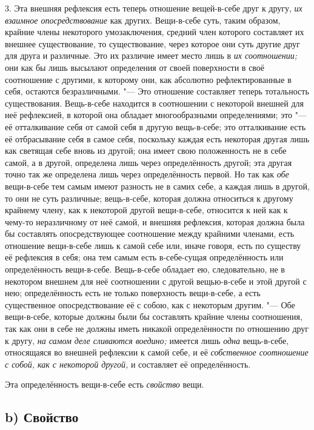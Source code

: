 3. Эта внешняя рефлексия есть теперь отношение вещей-в-себе друг к другу,
{\em их взаимное опосредствование} как других.
Вещи-в-себе суть, таким образом, крайние члены некоторого умозаключения,
средний член которого составляет их внешнее существование, то
существование, через которое они суть другие друг для друга и различные.
Это их различие имеет место лишь в {\em их соотношении;} они как бы
лишь высылают определения от своей поверхности в
своё соотношение с другими, к которому они, как абсолютно рефлектированные
в себя, остаются безразличными. "--- Это отношение составляет теперь
тотальность существования. Вещь-в-себе находится в соотношении с некоторой
внешней для неё рефлексией, в которой она обладает многообразными
определениями; это "--- её отталкивание себя от самой себя в другую вещь-в-себе;
это отталкивание есть её отбрасывание себя в самое себя, поскольку каждая
есть некоторая другая лишь как светящая себе вновь из другой; она имеет
свою положенность не в себе самой, а в другой, определена лишь через
определённость другой; эта другая точно так же определена лишь через
определённость первой. Но так как {\em обе} вещи-в-себе
тем самым имеют разность не в самих себе, а каждая лишь в другой, то они не
суть различные; вещь-в-себе, которая должна относиться к другому крайнему
члену, как к некоторой другой вещи-в-себе, относится к ней как к чему-то
неразличному от неё самой, и внешняя рефлексия, которая должна была бы
составлять опосредствующее соотношение между крайними членами, есть
отношение вещи-в-себе лишь к самой себе или, иначе говоря, есть по существу
её рефлексия в себя; она тем самым есть в-себе-сущая определённость или
определённость вещи-в-себе. Вещь-в-себе обладает ею, следовательно, не в
некотором внешнем для неё соотношении с другой вещью-в-себе и этой другой с
нею; определённость есть не только поверхность вещи-в-себе, а есть
существенное опосредствование её с собою, как с некоторым другим. "--- Обе
вещи-в-себе, которые должны были бы составлять крайние члены соотношения,
так как они в себе не должны иметь никакой определённости по отношению друг
к другу, {\em на самом деле сливаются воедино;} имеется лишь {\em одна}
вещь-в-себе, относящаяся во внешней рефлексии к самой себе, и её
{\em собственное соотношение с собой, как с некоторой другой,}
и составляет её определённость.

Эта определённость вещи-в-себе есть {\em свойство} вещи.

\subsection[b) Свойство]{b) Свойство}

